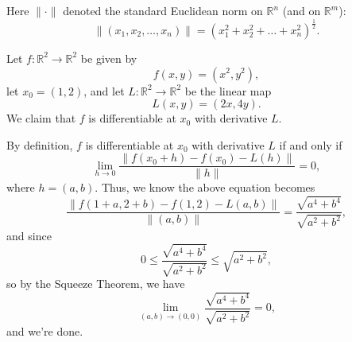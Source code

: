 \begin{remark}
    Here \(\lVert \cdot \rVert \) denoted the standard Euclidean norm on \(\mathbb{R} ^n\) (and on \(\mathbb{R} ^m\)):
    \[
        \lVert (x_1, x_2, \dots , x_n) \rVert = \left( x_1^2 + x_2^2 + \dots + x_n^2 \right)^{\frac{1}{2}}. 
    \]  
\end{remark}

\begin{eg}
    Let \(f: \mathbb{R} ^2 \to \mathbb{R} ^2\) be given by 
    \[
        f(x, y) = \left( x^2, y^2 \right), 
    \] 
    let \(x_0 = (1, 2)\), and let \(L: \mathbb{R} ^2 \to \mathbb{R} ^2\) be the linear map 
    \[
        L(x, y) = (2x, 4y).
    \]  
    We claim that \(f\) is differentiable at \(x_0\) with derivative \(L\).   
\end{eg}

\begin{explanation}
    By definition, \(f\) is differentiable at \(x_0\) with derivative \(L\) if and only if 
    \[
        \lim_{h \to 0} \frac{\left\lVert f(x_0 + h) - f(x_0) - L(h) \right\rVert }{\lVert h \rVert } = 0, 
    \]   
    where \(h = (a, b)\). Thus, we know the above equation becomes
    \[
        \frac{\left\lVert f(1+a, 2+b) - f(1, 2) - L(a, b) \right\rVert }{\lVert (a, b) \rVert } = \frac{\sqrt{a^4 + b^4} }{\sqrt{a^2 + b^2} },
    \] 
    and since 
    \[
        0 \le \frac{\sqrt{a^4 + b^4} }{\sqrt{a^2 + b^2} } \le \sqrt{a^2 + b^2}, 
    \]
    so by the Squeeze Theorem, we have 
    \[
        \lim_{(a, b) \to (0, 0)} \frac{\sqrt{a^4 + b^4} }{\sqrt{a^2 + b^2} } = 0, 
    \]
    and we're done.
\end{explanation}

